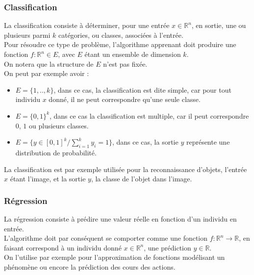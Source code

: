 \documentclass[10pt,a4paper]{report}
\begin{document}
			\subsubsection{Classification}
			La classification consiste à déterminer, pour une entrée $x \in \mathbb{R}^n$, en sortie, une ou plusieurs parmi $k$ catégories, ou classes, associées à l'entrée.\\
			Pour résoudre ce type de problème, l'algorithme apprenant doit produire une fonction $f : \mathbb{R}^n \in E$, avec $E$ étant un ensemble de dimension $k$.\\
			On notera que la structure de $E$ n'est pas fixée.\\
			On peut par exemple avoir :
			\begin{itemize}
				\item $E = \{1,..,k\}$, dans ce cas, la classification est dite simple, car pour tout individu $x$ donné, il ne peut correspondre qu'une seule classe.
				\item $E = \{0,1\}^k$, dans ce cas la classification est multiple, car il peut correspondre $0$, $1$ ou plusieurs classes.
				\item $E = \{y \in [0,1]^k/ \sum_{i=1}^{k}{y_i}=1  \}$, dans ce cas, la sortie $y$ représente une distribution de probabilité.
			\end{itemize}
			La classification est par exemple utilisée pour la reconnaissance d'objets, l'entrée $x$ étant l'image, et la sortie $y$, la classe de l'objet dans l'image.
			\subsubsection{Régression}
			La régression consiste à prédire une valeur réelle en fonction d'un individu en entrée.\\
			L'algorithme doit par conséquent se comporter comme une fonction $f : \mathbb{R}^n \rightarrow \mathbb{R}$, en faisant correspond à un individu donné $x \in \mathbb{R}^n$, une prédiction $y \in \mathbb{R}$.\\
			On l'utilise par exemple pour l'approximation de fonctions modélisant un phénomène ou encore la prédiction des cours des actions.
\end{document}
